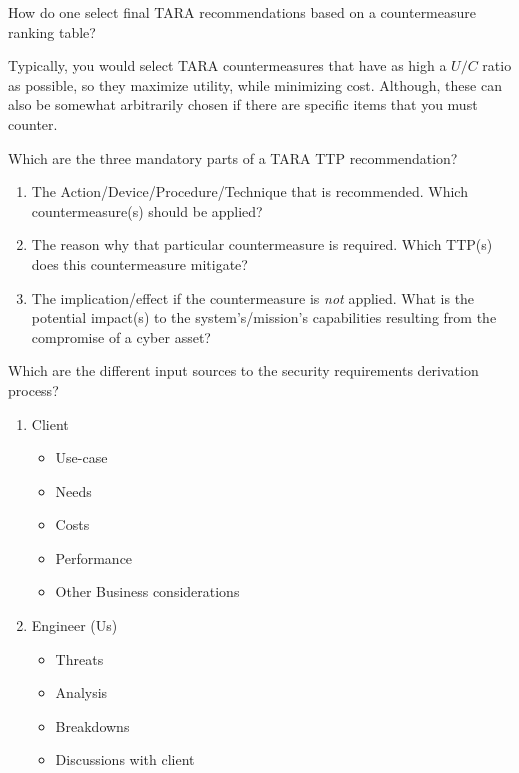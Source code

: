 \begin{questions}
\question{} How do one select final TARA recommendations based on a countermeasure ranking table?
  \begin{solution}
    Typically, you would select TARA countermeasures that have as high a $U/C$ ratio as possible, so they maximize utility, while minimizing cost.
    Although, these can also be somewhat arbitrarily chosen if there are specific items that you must counter.
  \end{solution}

\question{} Which are the three mandatory parts of a TARA TTP recommendation?
  \begin{solution}
    \begin{enumerate}[noitemsep]
    \item The Action/Device/Procedure/Technique that is recommended.
      Which countermeasure(s) should be applied?
    \item The reason why that particular countermeasure is required.
      Which TTP(s) does this countermeasure mitigate?
    \item The implication/effect if the countermeasure is \emph{not} applied.
      What is the potential impact(s) to the system's/mission's capabilities resulting from the compromise of a cyber asset?
    \end{enumerate}
  \end{solution}

\question{} Which are the different input sources to the security requirements derivation process?
  \begin{solution}
    \begin{enumerate}[noitemsep]
    \item Client
      \begin{itemize}[noitemsep]
      \item Use-case
      \item Needs
      \item Costs
      \item Performance
      \item Other Business considerations
      \end{itemize}
    \item Engineer (Us)
      \begin{itemize}[noitemsep]
      \item Threats
      \item Analysis
      \item Breakdowns
      \item Discussions with client
      \end{itemize}
    \end{enumerate}
  \end{solution}


\end{questions}
